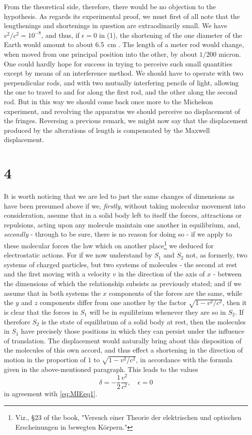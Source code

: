 From the theoretical side, therefore, there would be no objection to the hypothesis. As regards its experimental proof, we must first of all note that the lengthenings and shortenings in question are extraodinarily small. We have $v^2/c^2 = 10^{-8}$, and thus, if $\epsilon = 0$ in (1), the shortening of the one diameter of the Earth would amount to about \SI{6.5}{\cm} . The length of a meter rod would change, when moved from one principal position into the other, by about $1/200$ micron. One could hardly hope for success in trying to perceive such small quantities except by means of an interference method. We should have to operate with two perpendicular rods, and with two mutually interfering pencils of light, allowing the one to travel to and for along the first rod, and the other along the second rod. But in this way we should come back once more to the Michelson experiment, and revolving the apparatus we should perceive no displacement of the fringes. Reversing a previous remark, we might now say that the displacement produced by the alterations of length is compensated by the Maxwell displacement.

\section*{4}
It is worth noticing that we are led to just the same changes of dimensions as have been presumed above if we, \textit{firstly}, without taking molecular movement into consideration, assume that in a solid body left to itself the forces, attractions or repulsions, acting upon any molecule maintain one another in equilibrium, and, \textit{secondly} - through to be sure, there is no reason for doing so - if we apply to these molecular forces the law which on another place\footnote{Viz., \S 23 of the book, "Versuch einer Theorie der elektrischen und optischen Erscheinungen in bewegten Körpern."} we deduced for electrostatic actions. For if we now understand by $S_1$ and $S_2$ not, as formerly, two systems of charged particles, but two systems of molecules - the second at rest and the first moving with a velocity $v$ in the direction of the axis of $x$ - between the dimensions of which the relationship subsists as previously stated; and if we assume that in both systems the $x$ components of the forces are the same, while the $y$ and $z$ components differ from one another by the factor $\sqrt{1-v^2/c^2}$, then it is clear that the forces in $S_1$ will be in equilibrium whenever they are so in $S_2$. If therefore $S_2$ is the state of equilibrium of a solid body at rest, then the molecules in $S_1$ have precisely those positions in which they can persist under the influence of translation. The displacement would naturally bring about this disposition of the molecules of this own accord, and thus effect a shortening in the direction of motion in the proportion of $1$ to $\sqrt{1-v^2/c^2}$, in accordance with the formula given in the above-mentioned paragraph. This leads to the values
$$\delta = -\frac{1}{2}\frac{v^2}{c^2}, \quad \epsilon = 0$$
in agreement with \eqref{eq:MIEeq1}.

